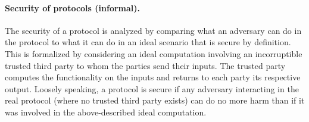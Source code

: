   \paragraph{Security of protocols (informal).}
  The security of a protocol is analyzed by comparing what an
  adversary can do in the protocol to what it can do in an ideal
  scenario that is secure by definition.  This is formalized by
  considering an ideal computation involving an incorruptible trusted
  third party to whom the parties send their inputs. The trusted party
  computes the functionality on the inputs and returns to each party its
  respective output. Loosely speaking, a protocol is secure if any
  adversary interacting in the real protocol (where no trusted third
  party exists) can do no more harm than if it was involved in the
  above-described ideal computation.
\fi
\iffalse %
  For the case of two parties, a simultaneous message exchange channel
  is equivalent to two point-to-point channels in reverse directions
  with {\em simultaneous} message delivery. We now present a protocol
  for two party computation. In fact, we present our protocol as a
  compiler: given an appropriate non-malleable commitment protocol of
  $\rnm$ rounds, we obtain a protocol for general two party computation
  in $r_{\mathsf{2pc}}$ {\em simultaneous message exchange rounds} where
  $r_\mathsf{2pc}:=\max (4, \rnm+1)$. That is, in each simultaneous
  message exchange round, both parties will simultaneously send
  messages, and when their messages have been delivered, the next round
  shall begin. Recall that, we will consider {\em rushing} adversaries
  in the proof of security where the adversary, in any given round, can
  wait for the honest parties' messages before sending his own message.
\fi

